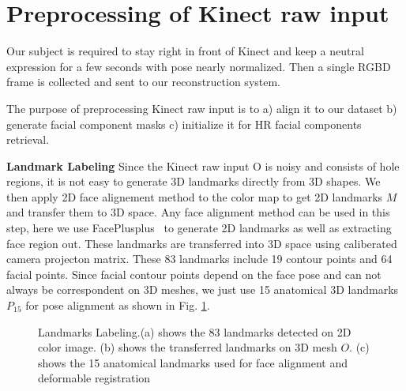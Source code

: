 \documentclass[annual]{acmsiggraph}
\begin{document}
\section{Preprocessing of Kinect raw input}
Our subject is required to stay right in front of Kinect and keep a neutral expression for a few seconds with pose nearly normalized. Then a single RGBD frame is collected and sent to our reconstruction system.

The purpose of preprocessing Kinect raw input is to a) align it to our dataset b) generate facial component masks c) initialize it for HR facial components retrieval.

\textbf{Landmark Labeling} Since the Kinect raw input O is noisy and consists of hole regions, it is not easy to generate 3D landmarks directly from 3D shapes.  We then apply 2D face alignement method to the color map to get 2D landmarks $M$ and transfer them to 3D space. Any face alignment method can be used in this step, here we use FacePlusplus~\cite{face++} to generate 2D landmarks as well as extracting face region out. These landmarks are transferred into 3D space using caliberated camera projecton matrix. These 83 landmarks include 19 contour points and 64 facial points. Since facial contour points depend on the face pose and can not always be correspondent on 3D meshes, we just use 15 anatomical 3D landmarks  $P_{15}$ for pose alignment as shown in Fig. \ref{landmarks}.

\begin{figure}[ht]
  \centering
{}
  \caption{Landmarks Labeling.(a) shows the 83 landmarks detected on 2D color image. (b) shows the transferred landmarks on 3D mesh $O$. (c) shows the 15 anatomical landmarks used for face alignment and deformable registration}\label{landmarks}
\end{figure}
\end{document}
